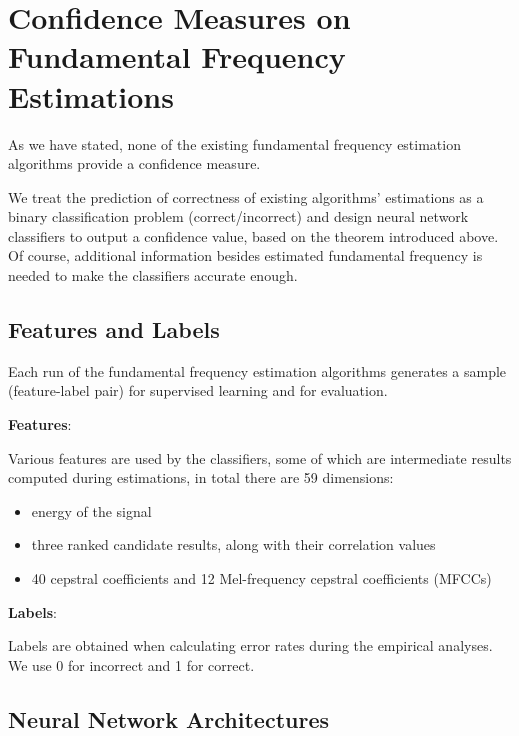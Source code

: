 \documentclass[11pt,a4paper,titlepage]{article}
\begin{document}
\newpage

\section{Confidence Measures on Fundamental Frequency Estimations}

As we have stated, none of the existing fundamental frequency estimation algorithms provide a confidence measure.

We treat the prediction of correctness of existing algorithms' estimations as a binary classification problem (correct/incorrect) and design neural network classifiers to output a confidence value, based on the theorem introduced above.
Of course, additional information besides estimated fundamental frequency is needed to make the classifiers accurate enough.

\subsection{Features and Labels}

Each run of the fundamental frequency estimation algorithms generates a sample (feature-label pair) for supervised learning and for evaluation.

\begin{mdframed}
\noindent \textbf{Features}:

Various features are used by the classifiers, some of which are intermediate results computed during estimations, in total there are 59 dimensions:

\begin{itemize}
  \item energy of the signal
  \item three ranked candidate results, along with their correlation values
  \item 40 cepstral coefficients and 12 Mel-frequency cepstral coefficients (MFCCs) \cite{mermelstein1976distance,davis1980comparison}
\end{itemize}

\noindent \textbf{Labels}:

Labels are obtained when calculating error rates during the empirical analyses.
We use 0 for incorrect and 1 for correct.
\end{mdframed}

\newpage

\subsection{Neural Network Architectures}
\end{document}
